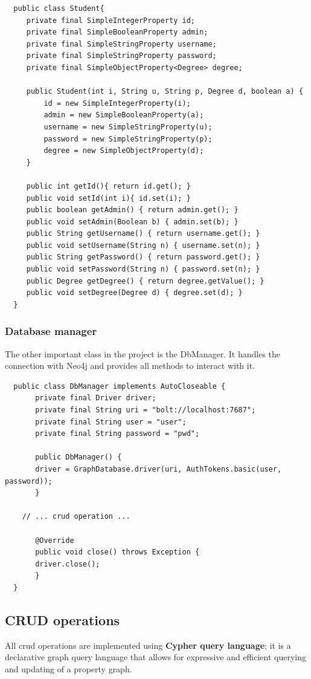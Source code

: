 \documentclass[a4paper]{article}
\begin{document}
\begin{verbatim}
  public class Student{
     private final SimpleIntegerProperty id;
     private final SimpleBooleanProperty admin;
     private final SimpleStringProperty username;
     private final SimpleStringProperty password;
     private final SimpleObjectProperty<Degree> degree;
    
     public Student(int i, String u, String p, Degree d, boolean a) {
         id = new SimpleIntegerProperty(i);
         admin = new SimpleBooleanProperty(a);
         username = new SimpleStringProperty(u);
         password = new SimpleStringProperty(p);
         degree = new SimpleObjectProperty(d);		
     }
    
     public int getId(){ return id.get(); }
     public void setId(int i){ id.set(i); }
     public boolean getAdmin() { return admin.get(); }
     public void setAdmin(Boolean b) { admin.set(b); }
     public String getUsername() { return username.get(); }
     public void setUsername(String n) { username.set(n); }
     public String getPassword() { return password.get(); }
     public void setPassword(String n) { password.set(n); }
     public Degree getDegree() { return degree.getValue(); }
     public void setDegree(Degree d) { degree.set(d); }
  }
\end{verbatim}

\subsubsection{Database manager}
The other important class in the project is the DbManager. It handles the connection with Neo4j and provides all methods to interact with it.

\begin{verbatim}
  public class DbManager implements AutoCloseable {
       private final Driver driver;
       private final String uri = "bolt://localhost:7687";
       private final String user = "user";
       private final String password = "pwd";

       public DbManager() {
       driver = GraphDatabase.driver(uri, AuthTokens.basic(user, password));
       }

    // ... crud operation ...

       @Override
       public void close() throws Exception {
       driver.close();
       }
  }
\end{verbatim}


\subsection{CRUD operations}
All crud operations are implemented using \textbf{Cypher query language}; it is a declarative graph query language that allows for expressive and efficient querying and updating of a property graph.
\end{document}
